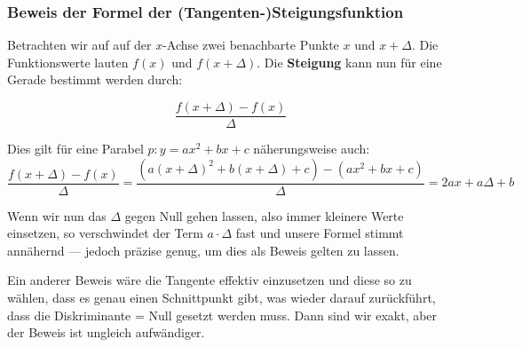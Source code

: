 \newpage

\subsubsection{Beweis der Formel der (Tangenten-)Steigungsfunktion}

Betrachten wir auf auf der $x$-Achse zwei benachbarte Punkte $x$ und
$x+\Delta$. Die Funktionswerte lauten $f(x)$ und $f(x+\Delta)$. Die
\textbf{Steigung} kann nun für eine Gerade bestimmt werden durch:


$$\frac{f(x+\Delta) - f(x)}{\Delta}$$

Dies gilt für eine Parabel $p: y=ax^2+bx+c$ näherungsweise auch:
$$\frac{f(x+\Delta)-f(x)}{\Delta} = \frac{\left(a(x+\Delta)^2 + b(x+\Delta)
  + c\right) - (ax^2 + bx +c)}{\Delta}=2ax+a\Delta+b$$

Wenn wir nun das $\Delta$ gegen Null gehen lassen, also immer kleinere
Werte einsetzen, so verschwindet der Term $a\cdot{}\Delta$ fast und unsere
Formel stimmt annähernd --- jedoch präzise genug, um dies als Beweis
gelten zu lassen.

Ein anderer Beweis wäre die Tangente effektiv einzusetzen und diese so
zu wählen, dass es genau einen Schnittpunkt gibt, was wieder darauf
zurückführt, dass die Diskriminante = Null gesetzt werden muss. Dann
sind wir exakt, aber der Beweis ist ungleich aufwändiger.
\newpage

